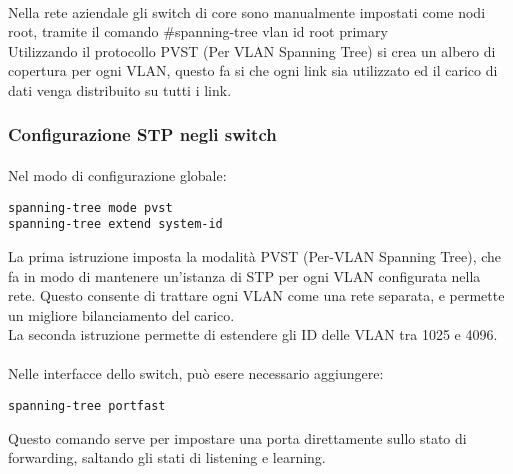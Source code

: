 \paragraph{} Nella rete aziendale gli switch di core sono manualmente impostati come nodi root, tramite il comando \textsf{\#spanning-tree vlan id root primary} \\
Utilizzando il protocollo PVST (Per VLAN Spanning Tree) si crea un albero di copertura per ogni VLAN, questo fa si che ogni link sia utilizzato ed il carico di dati venga distribuito su tutti i link.
\subsubsection{Configurazione STP negli switch}
\paragraph{} Nel modo di configurazione globale:
\begin{lstlisting}
spanning-tree mode pvst
spanning-tree extend system-id
\end{lstlisting}
La prima istruzione imposta la modalità PVST (Per-VLAN Spanning Tree), che fa in modo di mantenere un’istanza di STP per ogni VLAN configurata nella rete. Questo consente di trattare ogni VLAN come una rete separata, e permette un migliore bilanciamento del carico. \\
La seconda istruzione permette di estendere gli ID delle VLAN tra 1025 e 4096.  
\paragraph{} Nelle interfacce dello switch, può esere necessario aggiungere:
\begin{lstlisting}
spanning-tree portfast
\end{lstlisting}
Questo comando serve per impostare una porta direttamente sullo stato di forwarding, saltando gli stati di listening e learning.  
